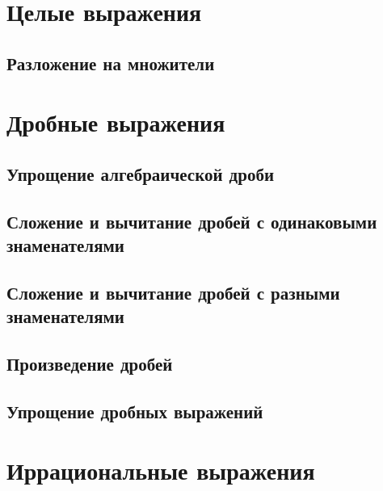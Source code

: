 \documentclass[10pt, a4paper]{article}
\begin{document}
\section{Целые выражения}
	\subsection{Разложение на множители}
\section{Дробные выражения}
	\subsection{Упрощение алгебраической дроби}
	\subsection{Сложение и вычитание дробей с одинаковыми знаменателями}
	\subsection{Сложение и вычитание дробей с разными знаменателями}
	\subsection{Произведение дробей}
	\subsection{Упрощение дробных выражений}
\section{Иррациональные выражения}
\end{document}
